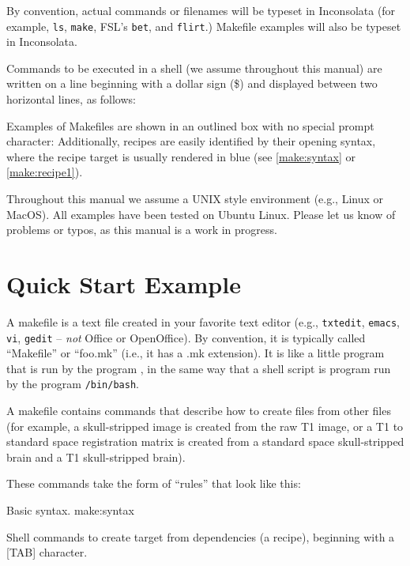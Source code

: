 By convention, actual commands or filenames will be typeset in Inconsolata (for example, \texttt{ls}, \texttt{make}, FSL's \texttt{bet}, and \texttt{flirt}.) Makefile examples will also be typeset in Inconsolata.
	
Commands to be executed in a shell (we assume \bashn{} throughout this manual) are written on a line beginning with a dollar sign (\$) and displayed between two horizontal lines, as follows:	
	
Examples of Makefiles are shown in an outlined box with no special prompt character:
Additionally, recipes are easily identified by their opening syntax, where the recipe target is usually rendered in blue (see \autoref{make:syntax} or \autoref{make:recipe1}).	
	
Throughout this manual we assume a UNIX style environment (e.g., Linux or MacOS). All examples have been tested on Ubuntu Linux. Please let us know of problems or typos, as this manual is a work in progress.
	
\section{Quick Start Example}
	
A makefile is a text file created in your favorite text editor (e.g., \texttt{txtedit}, \texttt{emacs}, \texttt{vi}, \texttt{gedit} -- \emph{not} Office or OpenOffice). By convention, it is typically called ``Makefile'' or ``foo.mk'' (i.e., it has a .mk extension). It is like a little program that is run by the program \maken{}, in the same way that a shell script is program run by the program \texttt{/bin/bash}.
	
A makefile contains commands that describe how to create files from other files (for example, a skull-stripped image is created from the raw T1 image, or a T1 to standard space registration matrix is created from a standard space skull-stripped brain and a T1 skull-stripped brain).
	
These commands take the form of ``rules'' that look like this:
	
\begin{make}{Basic \maken{} syntax. }{make:syntax}
	 \\
	\tab \begin{minipage}[t]{\linewidth-4em} {\color{gray} Shell commands to create target from dependencies (a recipe), beginning with a [TAB] character.} \end{minipage}
\end{make}
	
